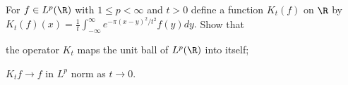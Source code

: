 For $f\in L^p(\R)$ with $1\leq p<\infty$ and $t>0$ define a function
$K_t(f)$ on $\R$ by $K_t(f)(x)
=\frac{1}{t}\int_{-\infty}^{\infty}e^{-\pi(x-y)^2/t^2}f(y)dy.$ Show
that
\begin{alist}
\item the operator $K_t$ maps the unit ball of $L^p(\R)$ into itself;
\item $K_tf\rightarrow f$ in $L^p$ norm as $t\rightarrow 0$.
\end{alist}
